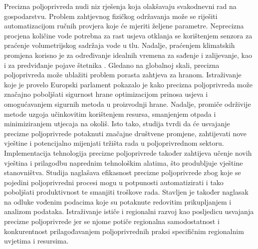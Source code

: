Precizna poljoprivreda nudi niz rješenja koja olakšavaju svakodnevni rad na gospodarstvu. Problem zahtjevnog fizičkog održavanja može se riješiti automatizacijom ručnih provjera koje će mjeriti željene parametre. Neprecizna procjena količine vode potrebna za rast usjeva otklanja se korištenjem senzora za praćenje volumetrijskog sadržaja vode u tlu. Nadalje, praćenjem klimatskih promjena korisno je za određivanje idealnih vremena za sađenje i zalijevanje, kao i za predviđanje pojave štetnika \cite{iotnet_usecase}. Gledano na globalnoj skali, precizna poljoprivreda može ublažiti problem porasta zahtjeva za hranom. Istraživanje koje je provelo Europski parlament \cite{eu_study} pokazalo je kako precizna poljoprivreda može značajno poboljšati sigurnost hrane optimizacijom prinosa usjeva i omogućavanjem sigurnih metoda u proizvodnji hrane. Nadalje, promiče održivije metode uzgoja učinkovitim korištenjem resursa, smanjenjem otpada i minimiziranjem utjecaja na okoliš. Isto tako, studija tvrdi da će usvajanje precizne poljoprivrede potaknuti značajne društvene promjene, zahtijevati nove vještine i potencijalno mijenjati tržišta rada u poljoprivrednom sektoru. Implementacija tehnologija precizne poljoprivrede također zahtijeva učenje novih vještina i prilagodbu naprednim tehnološkim alatima, što produbljuje vještine stanovništva. Studija naglašava efikasnost precizne poljoprivrede zbog koje se pojedini poljoprivredni procesi mogu u potpunosti automatizirati i tako poboljšati produktivnost te smanjiti troškove rada. Stavljen je također naglasak na odluke vođenim podacima  koje su potaknute redovitim prikupljanjem i analizom podataka. Istraživanje ističe i regionalni razvoj kao posljedicu usvajanja precizne poljoprivrede jer se njome potiče regionalna samodostatnost i konkurentnost prilagođavanjem poljoprivrednih praksi specifičnim regionalnim uvjetima i resursima.

